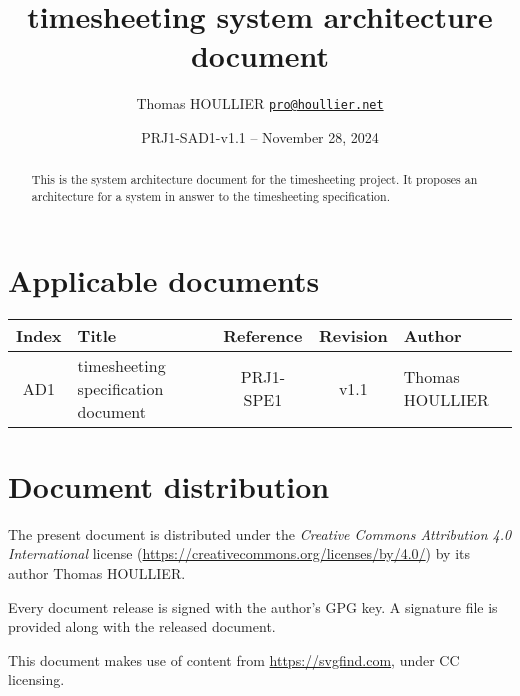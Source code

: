 \documentclass[letterpaper]{article}
\title{timesheeting system architecture document}
\author{Thomas HOULLIER \href{mailto:pro@houllier.net}
         {\texttt{\textlangle pro@houllier.net\textrangle}}}
\begin{document}
\frenchspacing
\date{PRJ1-SAD1-v1.1 -- November 28, 2024}
\maketitle
\thispagestyle{FirstPage}

\begin{abstract}
  This is the system architecture document for the timesheeting project.
  It proposes an architecture for a system in answer to the timesheeting
  specification.
\end{abstract}

\begin{versionhistory}
\end{versionhistory}
\setcounter{table}{0} %

\section*{Applicable documents}
{ \centering
\begin{tabularx}{\textwidth}{| c | X | c | c | X |} \hline
  Index & Title & Reference & Revision & Author \\ \hline
  AD1   & timesheeting specification document & PRJ1-SPE1 & v1.1 & Thomas HOULLIER \\
  \hline \end{tabularx} \par }

\section*{Document distribution}
The present document is distributed under the \emph{Creative Commons Attribution
4.0 International} license (\url{https://creativecommons.org/licenses/by/4.0/})
by its author Thomas HOULLIER.

Every document release is signed with the author's GPG key. A signature file
is provided along with the released document.

This document makes use of content from \url{https://svgfind.com}, under
CC licensing.

\tableofcontents
\printglossary[type=\acronymtype,style=index]
\pagestyle{plain}





\appendix


\apptocmd{\thebibliography}{\raggedright}{}{}
\begingroup
{}
\setlength\bibitemsep{0pt}
\printbibliography
\endgroup
\end{document}
